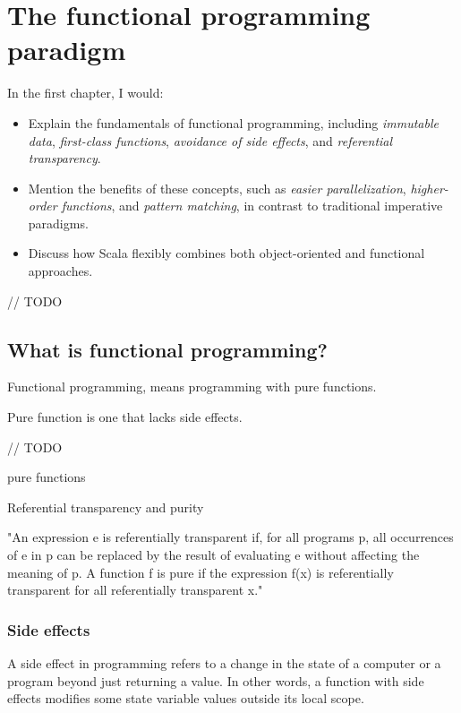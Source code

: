 \chapter{The functional programming paradigm}

In the first chapter, I would:

\begin{itemize}
\item Explain the fundamentals of functional programming, including \emph{immutable data}, \emph{first-class functions}, \emph{avoidance of side effects}, and \emph{referential transparency}. 
\item Mention the benefits of these concepts, such as \emph{easier parallelization}, \emph{higher-order functions}, and \emph{pattern matching}, in contrast to traditional imperative paradigms.
\item Discuss how Scala flexibly combines both object-oriented and functional approaches.
\end{itemize}


// TODO

\section{What is functional programming?}

Functional programming, means programming with pure functions.

Pure function is one that lacks side effects.\footnotemark

// TODO

pure functions

Referential transparency and purity

"An expression e is referentially transparent if, for all programs p, all occurrences of e in p can be replaced by the result of evaluating e without affecting the meaning of p. A function f is pure if the expression f(x) is referentially transparent for all referentially transparent x."\footnotemark


\subsection{Side effects}

A side effect in programming refers to a change in the state of a computer or a program beyond just returning a value. In other words, a function with side effects modifies some state variable values outside its local scope.

